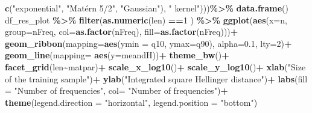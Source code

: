 \documentclass[
]{article}
\newenvironment{Shaded}{\begin{snugshade}}{\end{snugshade}}
\newcommand{\AttributeTok}[1]{\textcolor[rgb]{0.13,0.29,0.53}{#1}}
\newcommand{\DecValTok}[1]{\textcolor[rgb]{0.00,0.00,0.81}{#1}}
\newcommand{\FloatTok}[1]{\textcolor[rgb]{0.00,0.00,0.81}{#1}}
\newcommand{\FunctionTok}[1]{\textcolor[rgb]{0.13,0.29,0.53}{\textbf{#1}}}
\newcommand{\NormalTok}[1]{#1}
\newcommand{\SpecialCharTok}[1]{\textcolor[rgb]{0.81,0.36,0.00}{\textbf{#1}}}
\newcommand{\StringTok}[1]{\textcolor[rgb]{0.31,0.60,0.02}{#1}}
\begin{document}
\begin{Shaded}
\begin{Highlighting}[]
                                              \FunctionTok{c}\NormalTok{(}\StringTok{"exponential"}\NormalTok{,}
                                                \StringTok{"Matérn 5/2"}\NormalTok{,}
                                                \StringTok{"Gaussian"}\NormalTok{),}
                                              \StringTok{" kernel"}\NormalTok{)))}\SpecialCharTok{\%\textgreater{}\%}
  \FunctionTok{data.frame}\NormalTok{()}
\NormalTok{df\_res\_plot }\SpecialCharTok{\%\textgreater{}\%}
  \FunctionTok{filter}\NormalTok{(}\FunctionTok{as.numeric}\NormalTok{(len) }\SpecialCharTok{==}\DecValTok{1}\NormalTok{ ) }\SpecialCharTok{\%\textgreater{}\%}
  \FunctionTok{ggplot}\NormalTok{(}\FunctionTok{aes}\NormalTok{(}\AttributeTok{x=}\NormalTok{n, }\AttributeTok{group=}\NormalTok{nFreq, }
             \AttributeTok{col=}\FunctionTok{as.factor}\NormalTok{(nFreq), }\AttributeTok{fill=}\FunctionTok{as.factor}\NormalTok{(nFreq)))}\SpecialCharTok{+}
  \FunctionTok{geom\_ribbon}\NormalTok{(}\AttributeTok{mapping=}\FunctionTok{aes}\NormalTok{(}\AttributeTok{ymin =}\NormalTok{ q10, }\AttributeTok{ymax=}\NormalTok{q90), }\AttributeTok{alpha=}\FloatTok{0.1}\NormalTok{, }\AttributeTok{lty=}\DecValTok{2}\NormalTok{)}\SpecialCharTok{+}
  \FunctionTok{geom\_line}\NormalTok{(}\AttributeTok{mapping=} \FunctionTok{aes}\NormalTok{(}\AttributeTok{y=}\NormalTok{meandH))}\SpecialCharTok{+}
  \FunctionTok{theme\_bw}\NormalTok{()}\SpecialCharTok{+}
  \FunctionTok{facet\_grid}\NormalTok{(len}\SpecialCharTok{\textasciitilde{}}\NormalTok{matpar)}\SpecialCharTok{+}
  \FunctionTok{scale\_x\_log10}\NormalTok{()}\SpecialCharTok{+}
  \FunctionTok{scale\_y\_log10}\NormalTok{()}\SpecialCharTok{+}
  \FunctionTok{xlab}\NormalTok{(}\StringTok{"Size of the training sample"}\NormalTok{)}\SpecialCharTok{+}
  \FunctionTok{ylab}\NormalTok{(}\StringTok{"Integrated square Hellinger distance"}\NormalTok{)}\SpecialCharTok{+}
  \FunctionTok{labs}\NormalTok{(}\AttributeTok{fill =} \StringTok{"Number of frequencies"}\NormalTok{,}
       \AttributeTok{col=} \StringTok{"Number of frequencies"}\NormalTok{)}\SpecialCharTok{+}
  \FunctionTok{theme}\NormalTok{(}\AttributeTok{legend.direction =} \StringTok{"horizontal"}\NormalTok{, }\AttributeTok{legend.position =} \StringTok{"bottom"}\NormalTok{)}
\end{Highlighting}
\end{Shaded}
\end{document}
